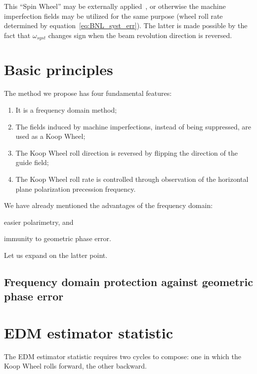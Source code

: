 \documentclass[a4paper]{jacow}
\newcommand{\w}{\omega}
\begin{document}
This ``Spin Wheel'' may be externally applied~\cite{Koop:SW}, or otherwise the machine imperfection fields
may be utilized for the same purpose (wheel roll rate determined by equation~\eqref{eq:BNL_syst_err}).
The latter is made possible by the fact that $\w_{syst}$ changes sign when the beam revolution direction
is reversed.~\cite[p.~11]{BNL:Deuteron2008}

\section{Basic principles}

The method we propose has four fundamental features:
\begin{enumerate}
\item It is a frequency domain method;
\item The fields induced by machine imperfections, instead of being suppressed,
  are used as a Koop Wheel;
\item The Koop Wheel roll direction is reversed by flipping the direction of the guide field;
\item The Koop Wheel roll rate is controlled through observation of the horizontal plane
  polarization precession frequency.
\end{enumerate}

We have already mentioned the advantages of the frequency domain:
\begin{inparaenum}
\item easier polarimetry, and
\item immunity to geometric phase error.
\end{inparaenum}
Let us expand on the latter point.

\subsection{Frequency domain protection against geometric phase error}

\section{EDM estimator statistic}
The EDM estimator statistic requires two cycles to compose: one in which the Koop Wheel rolls forward, the other backward.
\end{document}
